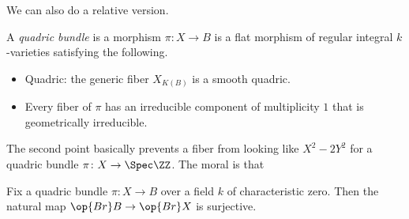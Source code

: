 \documentclass[../notes.tex]{subfiles}
\begin{document}
We can also do a relative version.
\begin{definition}
	A \textit{quadric bundle} is a morphism $\pi\colon X\to B$ is a flat morphism of regular integral $k$-varieties satisfying the following.
	\begin{itemize}
		\item Quadric: the generic fiber $X_{K(B)}$ is a smooth quadric.
		\item Every fiber of $\pi$ has an irreducible component of multiplicity $1$ that is geometrically irreducible.
	\end{itemize}
\end{definition}
\begin{remark}
	The second point basically prevents a fiber from looking like $X^2-2Y^2$ for a quadric bundle $\pi\colon X\to\Spec\ZZ$. The moral is that 
\end{remark}
\begin{proposition} \label{prop:br-quadric-bundle}
	Fix a quadric bundle $\pi\colon X\to B$ over a field $k$ of characteristic zero. Then the natural map $\op{Br}B\to\op{Br}X$ is surjective.
\end{proposition}
\end{document}
